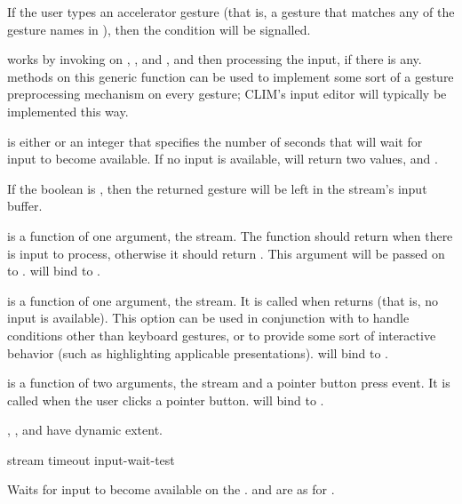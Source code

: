 If the user types an accelerator gesture (that is, a gesture that matches any of
the gesture names in ), then the 
condition will be signalled.

 works by invoking  on
, , and , and then processing the
input, if there is any.   methods on this generic function can be
used to implement some sort of a gesture preprocessing mechanism on every
gesture; CLIM's input editor will typically be implemented this way.

 is either  or an integer that specifies the number of
seconds that  will wait for input to become available.
If no input is available,  will return two values,
 and .

If the boolean  is , then the returned gesture will be
left in the stream's input buffer.

 is a function of one argument, the stream.  The function
should return  when there is input to process, otherwise it should
return .  This argument will be passed on to .
 will bind  to .

 is a function of one argument, the stream.  It is
called when  returns  (that is, no input is
available).  This option can be used in conjunction with 
to handle conditions other than keyboard gestures, or to provide some sort of
interactive behavior (such as highlighting applicable presentations).
 will bind  to
.

 is a function of two arguments, the stream
and a pointer button press event.  It is called when the user clicks a pointer
button.   will bind 
to .


, , and
 have dynamic extent.


 {stream \key timeout input-wait-test}

Waits for input to become available on the 
.   and  are as for
.


